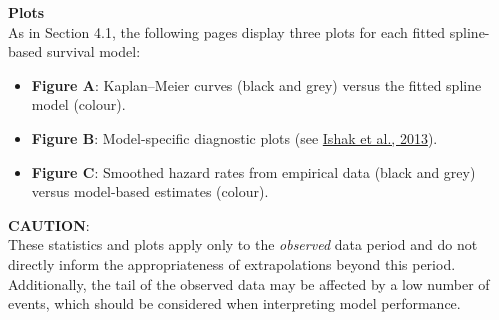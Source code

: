 \documentclass[
]{article}
\providecommand{\tightlist}{%
  \setlength{\itemsep}{0pt}\setlength{\parskip}{0pt}}
\begin{document}
\textbf{Plots}\\
As in Section 4.1, the following pages display three plots for each
fitted spline-based survival model:

\begin{itemize}
\tightlist
\item
  \textbf{Figure A}: Kaplan--Meier curves (black and grey) versus the
  fitted spline model (colour).\\
\item
  \textbf{Figure B}: Model-specific diagnostic plots (see
  \href{https://doi.org/10.1007/s40273-013-0064-3}{Ishak et al.,
  2013}).\\
\item
  \textbf{Figure C}: Smoothed hazard rates from empirical data (black
  and grey) versus model-based estimates (colour).
\end{itemize}

\textbf{CAUTION}:\\
These statistics and plots apply only to the \emph{observed} data period
and do not directly inform the appropriateness of extrapolations beyond
this period.\\
Additionally, the tail of the observed data may be affected by a low
number of events, which should be considered when interpreting model
performance.

\clearpage

\begin{table}[H]
\centering
\caption{\label{tab:Table_4}Goodness of fit statistics (including standard parametric and cure models)}
\centering
{}
\end{table}
\end{document}
